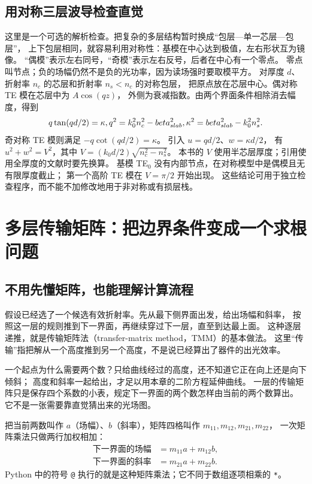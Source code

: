 \subsection{用对称三层波导检查直觉}
这里是一个可选的解析检查。把复杂的多层结构暂时换成“包层—单一芯层—包层”，
上下包层相同，就容易利用对称性：基模在中心达到极值，左右形状互为镜像。
“偶模”表示左右同号，“奇模”表示左右反号，后者在中心有一个零点。
零点叫节点；负的场幅仍然不是负的光功率，因为读场强时要取模平方。
对厚度 $d$、折射率 $n_c$ 的芯层和折射率 $n_s<n_c$ 的对称包层，
把原点放在芯层中心。偶对称 TE 模在芯层中为 $A\cos(qz)$，
外侧为衰减指数。由两个界面条件相除消去幅度，得到
\begin{equation}
q\tan(qd/2)=\kappa,
q^2=k_0^2n_c^2-beta_{slab}^2,
\kappa^2=beta_{slab}^2-k_0^2n_s^2.
\label{eq:symmetric_slab_dispersion}
\end{equation}
奇对称 TE 模则满足 $-q\cot(qd/2)=\kappa$。
引入 $u=qd/2$、$w=\kappa d/2$，
有 $u^2+w^2=V^2$，其中
$V=(k_0d/2)\sqrt{n_c^2-n_s^2}$。
本书的 $V$ 使用半芯层厚度；引用使用全厚度的文献时要先换算。
基模 TE$_0$ 没有内部节点，在对称模型中是偶模且无有限厚度截止；
第一个高阶 TE 模在 $V=\pi/2$ 开始出现。
这些结论可用于独立检查程序，而不能不加修改地用于非对称或有损层栈。

\section{多层传输矩阵：把边界条件变成一个求根问题}
\label{sec:vertical-tmm}
\subsection{不用先懂矩阵，也能理解计算流程}
假设已经选了一个候选有效折射率。先从最下侧界面出发，给出场幅和斜率，
按照这一层的规则推到下一界面，再继续穿过下一层，直至到达最上面。
这种逐层递推，就是传输矩阵法（transfer-matrix method，TMM）的基本做法。
这里“传输”指把解从一个高度推到另一个高度，不是说已经算出了器件的出光效率。

一个起点为什么需要两个数？只给曲线经过的高度，还不知道它正在向上还是向下倾斜；
高度和斜率一起给出，才足以用本章的二阶方程延伸曲线。
一层的传输矩阵只是保存四个系数的小表，规定下一界面的两个数怎样由当前的两个数算出。
它不是一张需要靠直觉猜出来的光场图。

把当前两数叫作 $a$（场幅）、$b$（斜率），矩阵四格叫作 $m_{11},m_{12},m_{21},m_{22}$，
一次矩阵乘法只做两行加权相加：
\[
\begin{aligned}
\text{下一界面的场幅}&=m_{11}a+m_{12}b,\\
\text{下一界面的斜率}&=m_{21}a+m_{22}b.
\end{aligned}
\]
Python 中的符号 \texttt{@} 执行的就是这种矩阵乘法；它不同于数组逐项相乘的 \texttt{*}。

